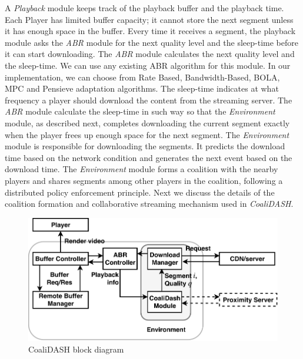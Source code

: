 % 
A {\it Playback} module keeps track of the playback buffer and the playback time. Each Player has limited buffer capacity; it cannot store the next segment unless it has enough space in the buffer. Every time it receives a segment, the playback module asks the {\it ABR} module for the next quality level and the sleep-time before it can start downloading.
The {\it ABR} module calculates the next quality level and the sleep-time. We can use any existing ABR algorithm for this module. In our implementation, we can choose from Rate Based, Bandwidth-Based, BOLA, MPC and Pensieve adaptation algorithms. The sleep-time indicates at what frequency a player should download the content from the streaming server.  The {\it ABR} module calculate the sleep-time in such way so that the {\it Environment} module, as described next, completes downloading the current segment exactly when the player frees up enough space for the next segment. The {\it Environment} module is responsible for downloading the segments. It predicts the download time based on the network condition and generates the next event based on the download time.
The {\it Environment} module forms a coalition with the nearby players and shares segments among other players in the coalition, following a distributed policy enforcement principle. Next we discuss the details of the coalition formation and collaborative streaming mechanism used in \textit{CoaliDASH}.

\begin{figure}[ht]
	\centering
	\includegraphics[width=\linewidth]{img/PlayerDiagram}
	\caption{\label{fig:playerdiagram} CoaliDASH block diagram}
\end{figure}